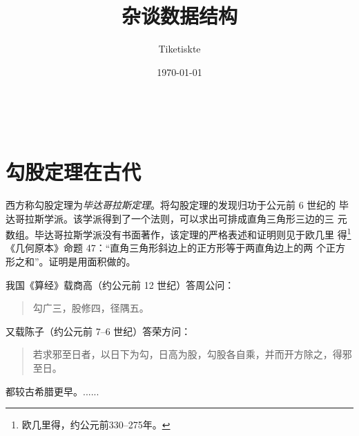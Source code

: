 \documentclass[UTF8]{ctexart} %
\title{\heiti 杂谈数据结构}
\author{Tiketiskte}
\date{\today}
\newenvironment{myquote}
    {\begin{quote}\kaishu\zihao{-5}}
    {\end{quote}}
\begin{document}

    \maketitle %
    \
    \tableofcontents %
    \section{勾股定理在古代} %
    西方称勾股定理为\emph{毕达哥拉斯定理}。将勾股定理的发现归功于公元前 6 世纪的
    毕达哥拉斯学派。该学派得到了一个法则，可以求出可排成直角三角形三边的三
    元数组。毕达哥拉斯学派没有书面著作，该定理的严格表述和证明则见于欧几里
    得\footnote{欧几里得，约公元前330--275年。}《几何原本》命题 47：“直角三角形斜边上的正方形等于两直角边上的两
    个正方形之和”。证明是用面积做的。

    我国《算经》载商高（约公元前 12 世纪）答周公问：
    \begin{myquote}
        勾广三，股修四，径隅五。
    \end{myquote}
    又载陈子（约公元前 7--6 世纪）答荣方问：%
    \begin{quote}
        \kaishu
        若求邪至日者，以日下为勾，日高为股，勾股各自乘，并而开方除之，得邪至日。
    \end{quote}
    都较古希腊更早。......
\end{document}
